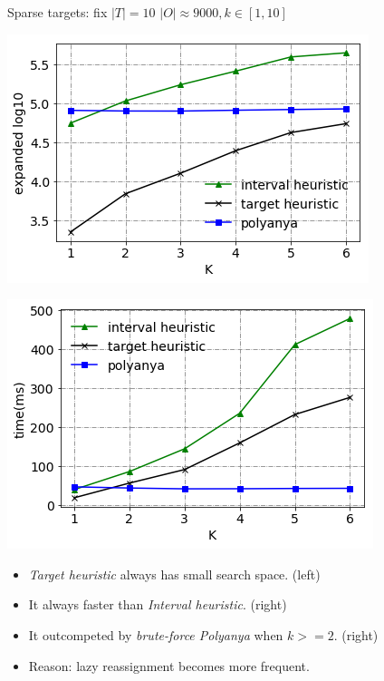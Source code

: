 \begin{frame}{Sparse targets: fix $|T|=10$}
\centering
$\scriptscriptstyle |O| \approx 9000, k \in [1, 10]$
\begin{minipage}{.5\textwidth}
    \begin{adjustbox}{max totalsize={.9\textwidth}{.9\textheight}, right}
    \centering
    \includegraphics{pic/e2_sparse_gen.png}
    \end{adjustbox}
\end{minipage}%
\begin{minipage}{.5\textwidth}
    \begin{adjustbox}{max totalsize={.9\textwidth}{.9\textheight}, right}
    \centering
    \includegraphics{pic/e2_sparse_time.png}
    \end{adjustbox}
\end{minipage}
\begin{itemize}
    \item \small{\textit{Target heuristic} always has small search space. (left)}
    \item \small{It always faster than \textit{Interval heuristic}. (right)}
    \item \small{It outcompeted by \textit{brute-force Polyanya} when $k>=2$. (right)}
    \item \small{Reason: lazy reassignment becomes more frequent.}
\end{itemize}
\end{frame}